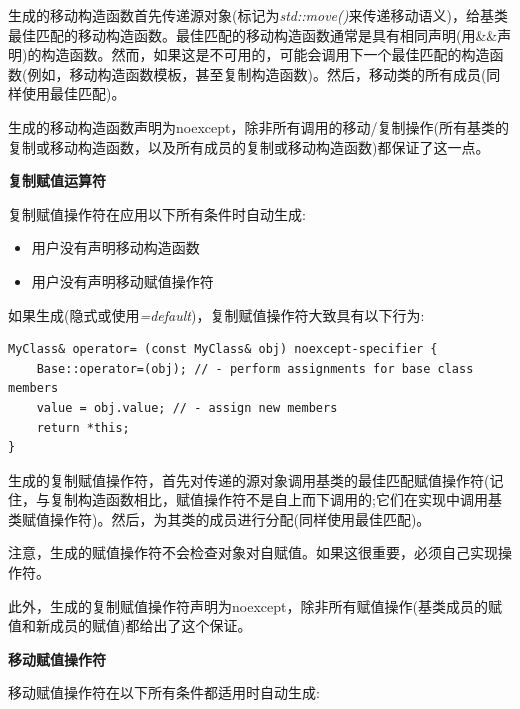 生成的移动构造函数首先传递源对象(标记为\textit{std::move()}来传递移动语义)，给基类最佳匹配的移动构造函数。最佳匹配的移动构造函数通常是具有相同声明(用\&\&声明)的构造函数。然而，如果这是不可用的，可能会调用下一个最佳匹配的构造函数(例如，移动构造函数模板，甚至复制构造函数)。然后，移动类的所有成员(同样使用最佳匹配)。\par

生成的移动构造函数声明为noexcept，除非所有调用的移动/复制操作(所有基类的复制或移动构造函数，以及所有成员的复制或移动构造函数)都保证了这一点。\par

\hspace*{\fill} \par %
\textbf{复制赋值运算符}

复制赋值操作符在应用以下所有条件时自动生成:\par

\begin{itemize}
	\item 用户没有声明移动构造函数
	\item 用户没有声明移动赋值操作符
\end{itemize}

如果生成(隐式或使用\textit{=default})，复制赋值操作符大致具有以下行为:

\begin{lstlisting}[caption={}]
MyClass& operator= (const MyClass& obj) noexcept-specifier {
	Base::operator=(obj); // - perform assignments for base class members
	value = obj.value; // - assign new members
	return *this;
}
\end{lstlisting}

生成的复制赋值操作符，首先对传递的源对象调用基类的最佳匹配赋值操作符(记住，与复制构造函数相比，赋值操作符不是自上而下调用的;它们在实现中调用基类赋值操作符)。然后，为其类的成员进行分配(同样使用最佳匹配)。\par

注意，生成的赋值操作符不会检查对象对自赋值。如果这很重要，必须自己实现操作符。\par

此外，生成的复制赋值操作符声明为noexcept，除非所有赋值操作(基类成员的赋值和新成员的赋值)都给出了这个保证。\par

\hspace*{\fill} \par %
\textbf{移动赋值操作符}

移动赋值操作符在以下所有条件都适用时自动生成:\par

